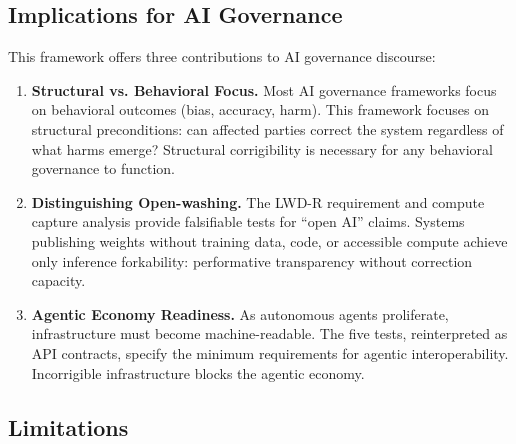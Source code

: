 \documentclass[11pt,a4paper]{article}
\theoremstyle{definition}
\begin{document}
\subsection{Implications for AI Governance}

This framework offers three contributions to AI governance discourse:

\begin{enumerate}
    \item \textbf{Structural vs. Behavioral Focus.} Most AI governance frameworks focus on behavioral outcomes (bias, accuracy, harm). This framework focuses on structural preconditions: can affected parties correct the system regardless of what harms emerge? Structural corrigibility is necessary for any behavioral governance to function.

    \item \textbf{Distinguishing Open-washing.} The LWD-R requirement and compute capture analysis provide falsifiable tests for ``open AI'' claims. Systems publishing weights without training data, code, or accessible compute achieve only inference forkability: performative transparency without correction capacity.

    \item \textbf{Agentic Economy Readiness.} As autonomous agents proliferate, infrastructure must become machine-readable. The five tests, reinterpreted as API contracts, specify the minimum requirements for agentic interoperability. Incorrigible infrastructure blocks the agentic economy.
\end{enumerate}

\subsection{Limitations}
\end{document}
